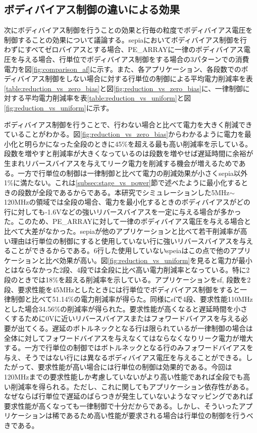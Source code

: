 {\subsection{ボディバイアス制御の違いによる効果}

次にボディバイアス制御を行うことの効果と行毎の粒度でボディバイアス電圧を制御することの効果について議論する。sepiaにおいてボディバイアス制御を行わずにすべてゼロバイアスとする場合、PE\_ARRAYに一律のボディバイアス電圧を与える場合、行単位でボディバイアス制御をする場合の3パターンでの消費電力を図\ref{fig:comparison_af}に示す。また、各アプリケーション、各段数でのボディバイアス制御をしない場合に対する行単位の制御による平均電力削減率を表\ref{table:reduction_vs_zero_bias}と図\ref{fig:reduction_vs_zero_bias}に、一律制御に対する平均電力削減率を表\ref{table:reduction_vs_uniform}と図\ref{fig:reduction_vs_uniform}に示す。

ボディバイアス制御を行うことで、行わない場合と比べて電力を大きく削減できていることがわかる。図\ref{fig:reduction_vs_zero_bias}からわかるように電力を最小化と明らかになった全段のときに45\%を超える最も高い削減率を示している。段数を増やすと削減率が大きくなっているのは段数を増やせば遅延時間に余裕が生まれリバースバイアスを与えてリーク電力を削減する機会が増えるためである。一方で行単位の制御は一律制御と比べて電力の削減効果が小さくsepia以外1\%に満たない。これは\ref{subsec:stage_vs_power}節で述べたように最小化するときの段数が全段であるからである。本研究でシミュレーションした5MHz$\sim$120MHzの領域では全段の場合、電力を最小化するときのボディバイアスがどの行に対しても-1.6Vなどの強いリバースバイアスを一定に与える場合が多かった。このため、PE\_ARRAYに対して一律のボディバイアス電圧を与える場合と比べて大差がなかった。sepiaが他のアプリケーションと比べて若干削減率が高い理由は行単位の制御にすると使用していない行に強いリバースバイアスを与えることができるからである。6行した使用していないspeiaはこの点で他のアプリケーションと比べ効果が高い。図\ref{fig:reduction_vs_uniform}を見ると電力が最小とはならなかった2段、4段では全段に比べ高い電力削減率となっている。特に2段のときでは18\%を超える削減率を示している。アプリケーションをsf, 段数を2段、要求性能を45MHzとしたときには行単位でボディバイアス制御をすると一律制御と比べて51.14\%の電力削減率が得らた。同様にsfで4段、要求性能110MHzとした場合34.56\%の削減率が得られた。要求性能が高くなると遅延時間を小さくするために0Vに近いリバースバイアスまたはフォワードバイアスを与える必要が出てくる。遅延のボトルネックとなる行は限られているが一律制御の場合は全体に対してフォワードバイアスを与えなくてはならなくなりリーク電力が増大する。一方で行単位の制御ではボトルネックとなる行のみフォワードバイアスを与え、そうではない行には異なるボディバイアス電圧を与えることができる。したがって、要求性能が高い場合には行単位の制御は効果的である。今回は120MHzまでの要求性能しか考慮していないがより高い性能であれば全段でも高い削減率を得られる。ただし、これに関してもアプリケーション依存性がある。なぜならば行単位で遅延のばらつきが発生していないようなマッピングであれば要求性能が高くなっても一律制御で十分だからである。しかし、そういったアプリケーションは稀であるため高い性能が要求される場合は行単位の制御を行うべきである。

}
